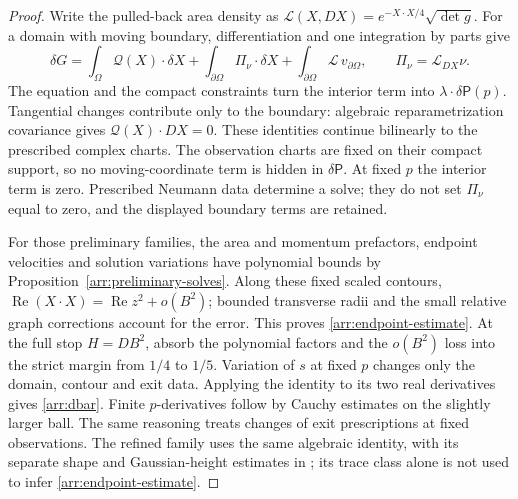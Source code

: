 \begin{proof}
Write the pulled-back area density as
\(\mathcal L(X,DX)=e^{-X\cdot X/4}\sqrt{\det g}\).
For a domain with moving boundary, differentiation and one
integration by parts give
\[
 \delta G
  =\int_\Omega \mathcal Q(X)\cdot\delta X
    +\int_{\partial\Omega}\Pi_\nu\cdot\delta X
    +\int_{\partial\Omega}\mathcal L\,v_{\partial\Omega},
 \qquad \Pi_\nu=\mathcal L_{DX}\nu .
\]
The equation and the compact constraints turn the interior term
into \(\lambda\cdot\delta\mathsf P(p)\).
Tangential changes contribute only to the boundary: algebraic
reparametrization covariance gives
\(\mathcal Q(X)\cdot DX=0\).
These identities continue bilinearly to the prescribed complex
charts.  The observation charts are fixed on their compact
support, so no moving-coordinate term is hidden in
\(\delta\mathsf P\).  At fixed \(p\) the interior term is zero.
Prescribed Neumann data determine a solve; they do not set
\(\Pi_\nu\) equal to zero, and the displayed boundary terms
are retained.

For those preliminary families, the area and momentum prefactors, endpoint velocities and
solution variations have polynomial bounds by
Proposition~\ref{arr:preliminary-solves}.
Along these fixed scaled contours,
\(\operatorname{Re}(X\cdot X)=\operatorname{Re}z^2+o(B^2)\);
bounded transverse radii and the small relative graph
corrections account for the error.  This proves
\eqref{arr:endpoint-estimate}.
At the full stop \(H=DB^2\), absorb the polynomial factors
and the \(o(B^2)\) loss into the strict margin from \(1/4\)
to \(1/5\).  Variation of \(s\) at fixed \(p\) changes only
the domain, contour and exit data.  Applying the identity
to its two real derivatives gives \eqref{arr:dbar}.
Finite \(p\)-derivatives follow by Cauchy estimates on the
slightly larger ball.  The same reasoning treats changes of
exit prescriptions at fixed observations.
The refined family uses the same algebraic identity, with its separate
shape and Gaussian-height estimates in ; its trace
class alone is not used to infer \eqref{arr:endpoint-estimate}.
\end{proof}

